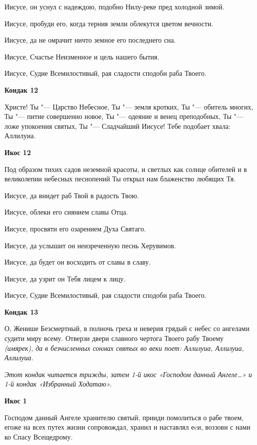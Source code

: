 Иисусе, он уснул с надеждою, подобно Нилу-реке пред холодной зимой. 


Иисусе, пробуди его, когда терния земли облекутся цветом вечности. 


Иисусе, да не омрачит ничто земное его последнего сна. 


Иисусе, Счастье Неизменное и цель нашего бытия. 


Иисусе, Судие Всемилостивый, рая сладости сподоби раба Твоего.




\bfseries Кондак 12\normalfont{}


Христе! Ты "--- Царство Небесное, Ты "--- земля кротких, Ты "--- обитель многих, Ты "--- питие совершенно новое, Ты "--- одеяние и венец преподобных, Ты "--- ложе упокоения святых, Ты "--- Сладчайший Иисусе! Тебе подобает хвала: Аллилуиа.




\bfseries Икос 12\normalfont{}


Под образом тихих садов неземной красоты, и светлых как солнце обителей и в великолепии небесных песнопений Ты открыл нам блаженство любящих Тя. 


Иисусе, да внидет раб Твой в радость Твою. 


Иисусе, облеки его сиянием славы Отца. 


Иисусе, просвяти его озарением Духа Святаго. 


Иисусе, да услышит он неизреченную песнь Херувимов. 


Иисусе, да будет он восходить от славы в славу. 


Иисусе, да узрит он Тебя лицем к лицу. 


Иисусе, Судие Всемилостивый, рая сладости сподоби раба Твоего.




\bfseries Кондак 13\normalfont{}


О, Женише Безсмертный, в полночь греха и неверия грядый с небес со ангелами судити миру всему. Отверзи двери славного чертога Твоего рабу Твоему \itshape (имярек)\normalfont{}, да в безчисленных сонмах святых во веки поет: Аллилуиа, Аллилуиа, Аллилуиа. 


\itshape Этот кондак читается трижды, затем 1-й икос «Господом данный Ангеле…» и 1-й кондак «Избранный Ходатаю».\normalfont{}




\bfseries Икос 1\normalfont{}


Господом данный Ангеле хранителю святый, прииди помолиться о рабе твоем, егоже на всех путех жизни сопровождал, хранил и наставлял еcи, воззови с нами ко Спасу Всещедрому. 



